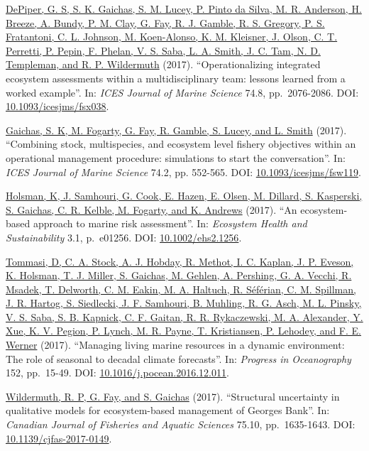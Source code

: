 \documentclass[11pt, a4paper]{awesome-cv}
\begin{document}
\protect\hyperlink{cite-depiper_operationalizing_2017}{DePiper, G. S, S. K.
Gaichas, S. M. Lucey, P. Pinto da Silva, M. R. Anderson, H. Breeze, A.
Bundy, P. M. Clay, G. Fay, R. J. Gamble, R. S. Gregory, P. S.
Fratantoni, C. L. Johnson, M. Koen-Alonso, K. M. Kleisner, J. Olson, C.
T. Perretti, P. Pepin, F. Phelan, V. S. Saba, L. A. Smith, J. C. Tam,
N. D. Templeman, and R. P.
Wildermuth} (2017).
``Operationalizing integrated ecosystem assessments within a
multidisciplinary team: lessons learned from a worked example''. In:
\emph{ICES Journal of Marine Science} 74.8, pp.~2076-2086. DOI:
\href{https://doi.org/10.1093\%2Ficesjms\%2Ffsx038}{10.1093/icesjms/fsx038}.

\protect\hyperlink{cite-gaichas_combining_2017}{Gaichas, S. K, M. Fogarty, G.
Fay, R. Gamble, S. Lucey, and L. Smith}
(2017). ``Combining stock, multispecies, and ecosystem level fishery
objectives within an operational management procedure: simulations to
start the conversation''. In: \emph{ICES Journal of Marine Science} 74.2, pp.
552-565. DOI:
\href{https://doi.org/10.1093\%2Ficesjms\%2Ffsw119}{10.1093/icesjms/fsw119}.

\protect\hyperlink{cite-holsman_ecosystem-based_2017}{Holsman, K, J. Samhouri,
G. Cook, E. Hazen, E. Olsen, M. Dillard, S. Kasperski, S. Gaichas, C.
R. Kelble, M. Fogarty, and K.
Andrews} (2017). ``An
ecosystem-based approach to marine risk assessment''. In: \emph{Ecosystem
Health and Sustainability} 3.1, p.~e01256. DOI:
\href{https://doi.org/10.1002\%2Fehs2.1256}{10.1002/ehs2.1256}.

\protect\hyperlink{cite-tommasi_managing_2017}{Tommasi, D, C. A. Stock, A. J.
Hobday, R. Methot, I. C. Kaplan, J. P. Eveson, K. Holsman, T. J.
Miller, S. Gaichas, M. Gehlen, A. Pershing, G. A. Vecchi, R. Msadek, T.
Delworth, C. M. Eakin, M. A. Haltuch, R. Séférian, C. M. Spillman, J.
R. Hartog, S. Siedlecki, J. F. Samhouri, B. Muhling, R. G. Asch, M. L.
Pinsky, V. S. Saba, S. B. Kapnick, C. F. Gaitan, R. R. Rykaczewski, M.
A. Alexander, Y. Xue, K. V. Pegion, P. Lynch, M. R. Payne, T.
Kristiansen, P. Lehodey, and F. E. Werner}
(2017). ``Managing living marine resources in a dynamic environment: The
role of seasonal to decadal climate forecasts''. In: \emph{Progress in
Oceanography} 152, pp.~15-49. DOI:
\href{https://doi.org/10.1016\%2Fj.pocean.2016.12.011}{10.1016/j.pocean.2016.12.011}.

\protect\hyperlink{cite-wildermuth_structural_2017}{Wildermuth, R. P, G. Fay,
and S. Gaichas} (2017). ``Structural
uncertainty in qualitative models for ecosystem-based management of
Georges Bank''. In: \emph{Canadian Journal of Fisheries and Aquatic Sciences}
75.10, pp.~1635-1643. DOI:
\href{https://doi.org/10.1139\%2Fcjfas-2017-0149}{10.1139/cjfas-2017-0149}.
\end{document}
